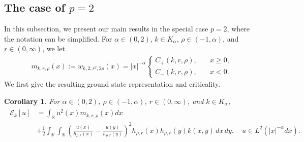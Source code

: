 \documentclass[12pt, a4paper]{amsart}
\newtheorem{corollary}[theorem]{Corollary}
\newcommand{\R}{\mathbb{R}}
\newcommand{\E}{\mathcal{E}}
\begin{document}
\subsection{The case of $p = 2$}\label{ss.p2} In this subsection, we present our main results in the special case $p=2$, where the notation can be simplified.
 For $\alpha \in (0, 2)$, $k \in K_\alpha$, $\rho \in (-1, \alpha)$, and $r \in (0, \infty)$, we let
\begin{align*}
    m_{k, r, \rho}(x) := w_{k,2,r^2,2\rho}(x) = |x|^{-\alpha}\begin{cases}
        C_+(k, r, \rho), &\quad x \geq 0,
        \\
        C_-(k, r, \rho), &\quad x < 0.
    \end{cases}
\end{align*}
We first give the resulting ground state representation and criticality.
\begin{corollary}
\label{corollary: case p = 2 ground state}
For $\alpha \in (0, 2)$, $\rho \in (-1, \alpha)$, $r \in (0, \infty)$, and $k \in K_\alpha$,
\begin{align}
\begin{split}
        \E_{k}[u] &=  \int_{\R}u^2(x)m_{k, r, \rho}(x)dx
    \\
    &+ \frac{1}{2}\int_{\R}\int_{\R} \left( \frac{u(x)}{h_{\rho, r}(x)} - \frac{u(y)}{h_{\rho, r}(y)}\right)^2 h_{\rho, r}(x)h_{\rho, r}(y) k(x, y)\,dx\,dy, \quad u \in L^2(|x|^{-\alpha}dx).
\end{split}
\end{align}
\end{corollary}
\end{document}
